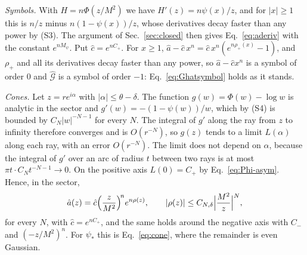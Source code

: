 \documentclass[aps,prd,10pt,twocolumn,superscriptaddress,nofootinbib,floatfix,longbibliography]{revtex4-2}
\begin{document}
\textit{Symbols.} With $H=n\Phi(z/M^2)$ we have $H'(z)=n\psi(x)/z$, and for $|x|\ge1$ this is $n/z$ minus $n(1-\psi(x))/z$, whose derivatives decay faster than any power by (S3). The argument of Sec.~\ref{sec:closed} then gives Eq.~\eqref{eq:aderiv} with the constant $e^{nM_\psi}$. Put $\hat c=e^{nC_+}$. For $x\ge1$, $\hat a-\hat c\,x^n=\hat c\,x^n(e^{n\rho_+(x)}-1)$, and $\rho_+$ and all its derivatives decay faster than any power, so $\hat a-\hat cx^n$ is a symbol of order $0$ and $\hat{\mathcal G}$ is a symbol of order $-1$: Eq.~\eqref{eq:Ghatsymbol} holds as it stands.

\textit{Cones.} Let $z=re^{i\alpha}$ with $|\alpha|\le\theta-\delta$. The function $g(w)=\Phi(w)-\log w$ is analytic in the sector and $g'(w)=-(1-\psi(w))/w$, which by (S4) is bounded by $C_N|w|^{-N-1}$ for every $N$. The integral of $g'$ along the ray from $z$ to infinity therefore converges and is $O(r^{-N})$, so $g(z)$ tends to a limit $L(\alpha)$ along each ray, with an error $O(r^{-N})$. The limit does not depend on $\alpha$, because the integral of $g'$ over an arc of radius $t$ between two rays is at most $\pi t\cdot C_Nt^{-N-1}\to0$. On the positive axis $L(0)=C_+$ by Eq.~\eqref{eq:Phi-asym}. Hence, in the sector,
\begin{equation}
\label{eq:cone-gen}
\hat a(z)=\hat c\Bigl(\frac z{M^2}\Bigr)^{\!n}e^{n\rho(z)},\qquad|\rho(z)|\le C_{N,\delta}\Bigl|\frac{M^2}z\Bigr|^N ,
\end{equation}
for every $N$, with $\hat c=e^{nC_+}$, and the same holds around the negative axis with $C_-$ and $(-z/M^2)^n$. For $\psi_*$ this is Eq.~\eqref{eq:cone}, where the remainder is even Gaussian.
\end{document}
